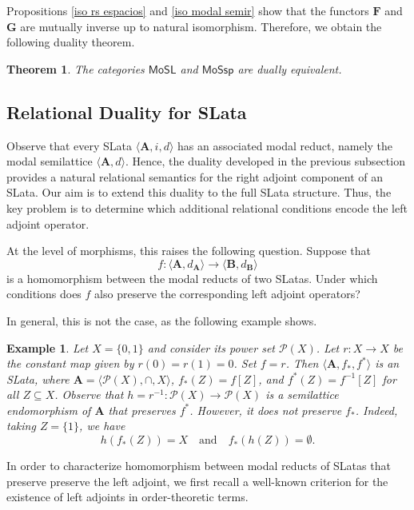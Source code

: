 \documentclass{article}
\newtheorem{theorem}{\bf Theorem}[section]
\newtheorem{example}{\bf Example}[section]
\begin{document}
Propositions \ref{iso rs espacios} and \ref{iso modal semir} show that the functors $\mathbf{F}$ and $\mathbf{G}$ are mutually inverse up to natural isomorphism. Therefore, we obtain the following duality theorem.

\begin{theorem}\label{dualidad RS espaces}
The categories $\mathsf{MoSL}$ and $\mathsf{MoSsp}$ are dually equivalent.
\end{theorem}

\subsection{Relational Duality for SLata}\label{Relational Duality for SLata}
Observe that every SLata $\langle \mathbf{A}, i, d \rangle$ has an associated modal reduct, namely the modal semilattice $\langle \mathbf{A}, d \rangle$. Hence, the duality developed in the previous subsection provides a natural relational semantics for the right adjoint component of an SLata. Our aim is to extend this duality to the full SLata structure. Thus, the key problem is to determine which additional relational conditions encode the left adjoint operator.
\medskip

At the level of morphisms, this raises the following question. Suppose that
\[
f:\langle \mathbf{A},d_\mathbf{A}\rangle\to \langle \mathbf{B},d_\mathbf{B}\rangle
\]
is a homomorphism between the modal reducts of two SLatas. Under which conditions does $f$ also preserve the corresponding left adjoint operators?

In general, this is not the case, as the following example shows.
   
\begin{example} 
Let $X=\{0,1\}$ and consider its power set $\mathcal{P}(X)$. Let $r \colon X \to X$ be the constant map given by $r(0)=r(1)=0$. Set $f=r$. Then $\langle \mathbf{A}, f_{\ast}, f^{\ast} \rangle$ is an SLata, where $\mathbf{A}=\langle \mathcal{P}(X), \cap, X \rangle$, $f_{\ast}(Z)=f[Z]$, and $f^{\ast}(Z)=f^{-1}[Z]$ for all $Z \subseteq X$. Observe that $h = r^{-1} \colon \mathcal{P}(X) \to \mathcal{P}(X)$ is a semilattice endomorphism of $\mathbf{A}$ that preserves $f^{\ast}$. However, it does not preserve $f_{\ast}$. Indeed, taking $Z=\{1\}$, we have
\[
h(f_{\ast}(Z)) = X \quad \text{and} \quad f_{\ast}(h(Z)) = \emptyset.
\]
\end{example}

In order to characterize homomorphism between modal reducts of SLatas that preserve preserve the left adjoint, we first recall a well-known criterion for the existence of left adjoints in order-theoretic terms.
\end{document}

